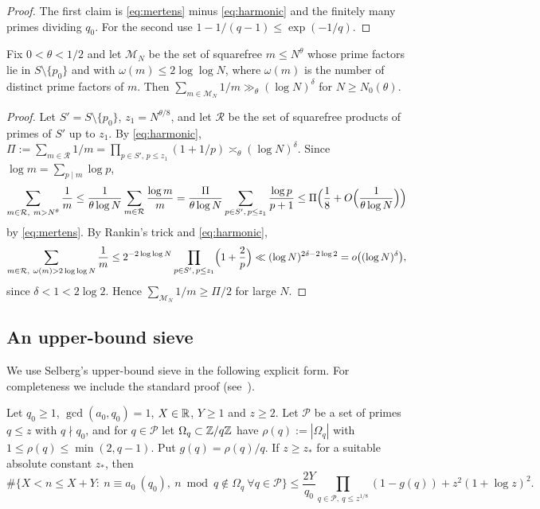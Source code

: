 \documentclass[11pt]{article}
\newcommand{\Mset}{\mathcal M}
\newcommand{\Pset}{\mathcal P}
\begin{document}
\begin{proof}
The first claim is \eqref{eq:mertens} minus \eqref{eq:harmonic} and the finitely
many primes dividing $q_0$. For the second use
$1-1/(q-1)\le\exp(-1/q)$.
\end{proof}

\begin{lemma}\label{lem:small}
Fix $0<\theta<1/2$ and let $\Mset_N$ be the set of squarefree $m\le N^\theta$
whose prime factors lie in $S\setminus\{p_0\}$ and with $\omega(m)\le2\log\log N$,
where $\omega(m)$ is the number of distinct prime factors of $m$.
Then $\sum_{m\in\Mset_N}1/m\gg_\theta(\log N)^\delta$ for $N\ge N_0(\theta)$.
\end{lemma}

\begin{proof}
Let $S'=S\setminus\{p_0\}$, $z_1=N^{\theta/8}$, and let $\mathcal R$ be the set
of squarefree products of primes of $S'$ up to $z_1$. By \eqref{eq:harmonic},
$\Pi:=\sum_{m\in\mathcal R}1/m=\prod_{p\in S',\,p\le z_1}(1+1/p)\asymp_\theta(\log N)^\delta$.
Since $\log m=\sum_{p\mid m}\log p$,
\[
\sum_{m\in\mathcal R,\ m>N^\theta}\frac1m\le\frac{1}{\theta\log N}\sum_{m\in\mathcal R}\frac{\log m}{m}
=\frac{\Pi}{\theta\log N}\sum_{p\in S',\,p\le z_1}\frac{\log p}{p+1}
\le\Pi\Bigl(\frac18+O\Bigl(\frac{1}{\theta\log N}\Bigr)\Bigr)
\]
by \eqref{eq:mertens}. By Rankin's trick and \eqref{eq:harmonic},
\[
\sum_{m\in\mathcal R,\ \omega(m)>2\log\log N}\frac1m\le
2^{-2\log\log N}\prod_{p\in S',\,p\le z_1}\Bigl(1+\frac2p\Bigr)
\ll(\log N)^{2\delta-2\log2}=o\bigl((\log N)^\delta\bigr),
\]
since $\delta<1<2\log2$. Hence $\sum_{\Mset_N}1/m\ge\Pi/2$ for large $N$.
\end{proof}

\subsection{An upper-bound sieve}

We use Selberg's upper-bound sieve in the following explicit form. For
completeness we include the standard proof (see~\cite[Ch.~3]{HalberstamRichert}).

\begin{lemma}\label{lem:selberg}
Let $q_0\ge1$, $\gcd(a_0,q_0)=1$, $X\in\mathbb R$, $Y\ge1$ and $z\ge2$. Let $\Pset$ be
a set of primes $q\le z$ with $q\nmid q_0$, and for $q\in\Pset$ let
$\Omega_q\subset\mathbb Z/q\mathbb Z$ have $\rho(q):=|\Omega_q|$ with
$1\le\rho(q)\le\min(2,q-1)$. Put $g(q)=\rho(q)/q$. If $z\ge z_*$ for a
suitable absolute constant $z_*$, then
\[
\#\{X<n\le X+Y:\ n\equiv a_0\ (q_0),\ n\bmod q\notin\Omega_q\ \forall q\in\Pset\}
\le\frac{2Y}{q_0}\prod_{q\in\Pset,\ q\le z^{1/8}}(1-g(q))+z^2(1+\log z)^2 .
\]
\end{lemma}
\end{document}
